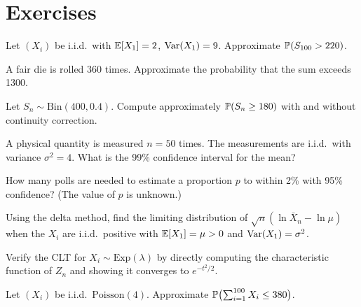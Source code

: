 \section{Exercises}

\begin{exercise}
Let $(X_i)$ be i.i.d.\ with $\mathbb{E}[X_1] = 2$, $\mathrm{Var}(X_1) = 9$. Approximate
$\mathbb{P}(S_{100} > 220)$.
\end{exercise}

\begin{exercise}
A fair die is rolled 360 times. Approximate the probability that the sum exceeds
1300.
\end{exercise}

\begin{exercise}
Let $S_n \sim \mathrm{Bin}(400, 0.4)$. Compute approximately
$\mathbb{P}(S_n \geq 180)$ with and without continuity correction.
\end{exercise}

\begin{exercise}
A physical quantity is measured $n = 50$ times. The measurements are i.i.d.\ with
variance $\sigma^2 = 4$. What is the 99\% confidence interval for the mean?
\end{exercise}

\begin{exercise}
How many polls are needed to estimate a proportion $p$ to within 2\% with 95\%
confidence? (The value of $p$ is unknown.)
\end{exercise}

\begin{exercise}
Using the delta method, find the limiting distribution of
$\sqrt{n}(\ln\bar{X}_n - \ln\mu)$ when the $X_i$ are i.i.d.\ positive with
$\mathbb{E}[X_1] = \mu > 0$ and $\mathrm{Var}(X_1) = \sigma^2$.
\end{exercise}

\begin{exercise}
Verify the CLT for $X_i \sim \mathrm{Exp}(\lambda)$ by directly computing the
characteristic function of $Z_n$ and showing it converges to $e^{-t^2/2}$.
\end{exercise}

\begin{exercise}
Let $(X_i)$ be i.i.d.\ $\mathrm{Poisson}(4)$. Approximate
$\mathbb{P}\bigl(\sum_{i=1}^{100} X_i \leq 380\bigr)$.
\end{exercise}
